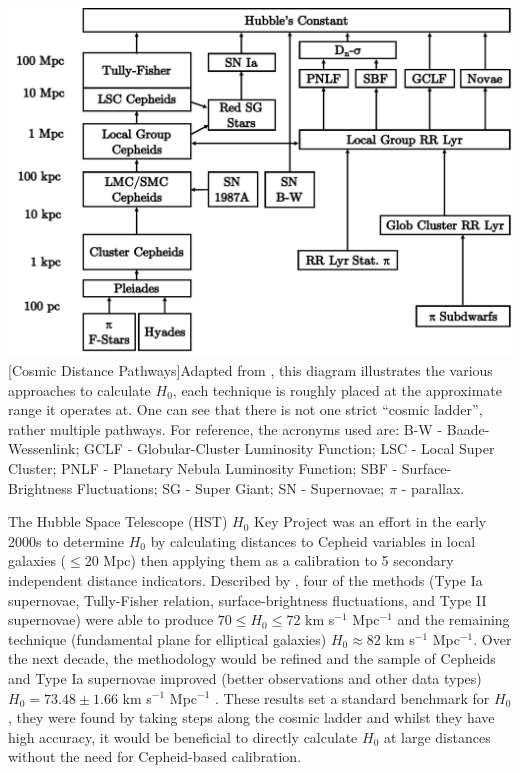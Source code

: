 \documentclass[12pt, onecolumn]{revtex4}    %
\begin{document}
\begin{center}
\includegraphics[width=0.8\linewidth]{figures/cosmic_distance_pathways}
[Cosmic Distance Pathways]{Adapted from \cite{jacoby_extragal}, this diagram illustrates the various approaches to calculate $H_0$, each technique is roughly placed at the approximate range it operates at. One can see that there is not one strict ``cosmic ladder'', rather multiple pathways. For reference, the acronyms used are: B-W - Baade-Wessenlink; GCLF - Globular-Cluster Luminosity Function; LSC - Local Super Cluster; PNLF - Planetary Nebula Luminosity Function; SBF - Surface-Brightness Fluctuations; SG - Super Giant; SN - Supernovae; $\pi$ - parallax.}
\label{fig:cosmic_pathways}
\end{center}

The Hubble Space Telescope (HST) $H_0$ Key Project was an effort in the early 2000s to determine $H_0$ by calculating distances to Cepheid variables in local galaxies ($\le 20$ Mpc) then applying them as a calibration to 5 secondary independent distance indicators. Described by \cite{freedman_hstkeystone}, four of the methods (Type Ia supernovae, Tully-Fisher relation, surface-brightness fluctuations, and Type II supernovae) were able to produce $70\le H_0 \le72$ km s$^{-1}$ Mpc$^{-1}$ and the remaining technique (fundamental plane for elliptical galaxies) $H_0\approx82$ km s$^{-1}$ Mpc$^{-1}$. Over the next decade, the methodology would be refined and the sample of Cepheids and Type Ia supernovae improved (better observations and other data types) $H_0=73.48 \pm1.66$ km s$^{-1}$ Mpc$^{-1}$ \citep{2011ApJ...730..119R, 2016ApJ...826...56R, 2018ApJ...855..136R}. These results set a standard benchmark for $H_0$, they were found by taking steps along the cosmic ladder and whilst they have high accuracy, it would be beneficial to directly calculate $H_0$ at large distances without the need for Cepheid-based calibration. \\
\end{document}
